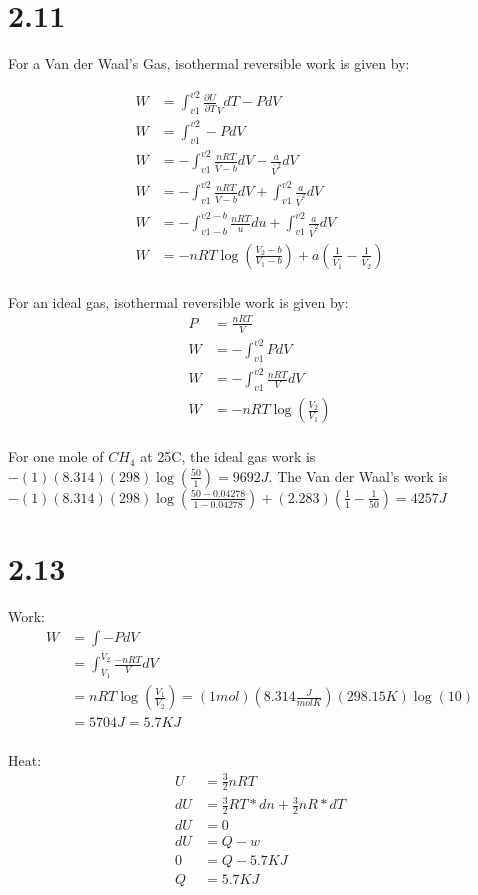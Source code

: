\documentclass[10pt]{article} %
\begin{document}
\section{2.11}
For a Van der Waal's Gas, isothermal reversible work is given by:

\begin{align}
  W &= \int_{v1}^{v2} \frac{\partial U}{\partial T}_V dT - PdV\\
  W &= \int_{v1}^{v2} -PdV\\
  W &= -\int_{v1}^{v2} \frac{nRT}{\bar{V} - b}dV - \frac{a}{\bar{V}^2} dV\\
  W &= -\int_{v1}^{v2} \frac{nRT}{\bar{V} - b}dV + \int_{v1}^{v2} \frac{a}{\bar{V}^2}dV\\
  W &= -\int_{v1-b}^{v2-b} \frac{nRT}{u}du + \int_{v1}^{v2} \frac{a}{\bar{V}^2}dV\\
  W &= -nRT\log(\frac{V_2-b}{V_1-b}) + a(\frac{1}{\bar{V}_1} - \frac{1}{\bar{V}_2})\\
\end{align}

For an ideal gas, isothermal reversible work is given by:\\

\begin{align}
  P &= \frac{nRT}{V}\\
  W &= -\int_{v1}^{v2} PdV\\
  W &= -\int_{v1}^{v2} \frac{nRT}{V}dV\\
  W &= -nRT\log(\frac{V_2}{V_1})\\
\end{align}

For one mole of $CH_4$ at 25C, the ideal gas work is $-(1)(8.314)(298)\log(\frac{50}{1}) = 9692J$. The Van der Waal's work is $-(1)(8.314)(298)\log(\frac{50-0.04278}{1-0.04278}) + (2.283)(\frac{1}{1} - \frac{1}{50}) = 4257J$

\section{2.13}
Work: 
\begin{align}
  W &= \int -PdV\\
  &= \int_{V_1}^{V_2} \frac{-nRT}{V} dV\\
  &= nRT\log(\frac{V_1}{V_2}) = (1 mol)(8.314 \frac{J}{mol K})(298.15K)\log(10)\\
  &= 5704J = 5.7KJ\\
\end{align}

Heat:
\begin{align}
  U &= \frac{3}{2}nRT\\
  dU &= \frac{3}{2}RT*dn + \frac{3}{2}nR * dT\\
  dU &= 0\\
  dU &= Q - w\\
  0 &= Q  -5.7KJ\\
  Q &= 5.7KJ\\
\end{align}
\end{document}
